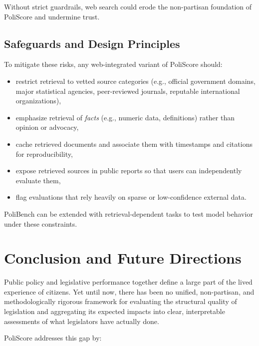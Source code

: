 \documentclass[12pt]{article}
\begin{document}
Without strict guardrails, web search could erode the non-partisan foundation of PoliScore and undermine trust.

\subsection{Safeguards and Design Principles}

To mitigate these risks, any web-integrated variant of PoliScore should:

\begin{itemize}
    \item restrict retrieval to vetted source categories (e.g., official government domains, major statistical agencies,
    peer-reviewed journals, reputable international organizations),
    \item emphasize retrieval of \emph{facts} (e.g., numeric data, definitions) rather than opinion or advocacy,
    \item cache retrieved documents and associate them with timestamps and citations for reproducibility,
    \item expose retrieved sources in public reports so that users can independently evaluate them,
    \item flag evaluations that rely heavily on sparse or low-confidence external data.
\end{itemize}

PoliBench can be extended with retrieval-dependent tasks to test model behavior under these constraints.


\section{Conclusion and Future Directions}
\label{sec:conclusion}

Public policy and legislative performance together define a large part of the lived experience of citizens. Yet until now,
there has been no unified, non-partisan, and methodologically rigorous framework for evaluating the structural quality of
legislation and aggregating its expected impacts into clear, interpretable assessments of what legislators have actually
done.

PoliScore addresses this gap by:
\end{document}
